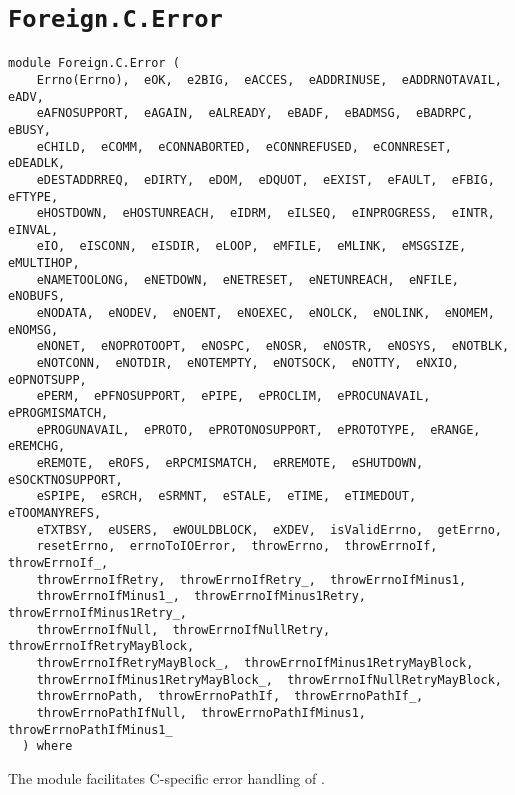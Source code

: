 \chapter{\texttt{Foreign.C.Error}}
\label{module:Foreign.C.Error}
\haddockbeginheader
{\haddockverb\begin{verbatim}
module Foreign.C.Error (
    Errno(Errno),  eOK,  e2BIG,  eACCES,  eADDRINUSE,  eADDRNOTAVAIL,  eADV, 
    eAFNOSUPPORT,  eAGAIN,  eALREADY,  eBADF,  eBADMSG,  eBADRPC,  eBUSY, 
    eCHILD,  eCOMM,  eCONNABORTED,  eCONNREFUSED,  eCONNRESET,  eDEADLK, 
    eDESTADDRREQ,  eDIRTY,  eDOM,  eDQUOT,  eEXIST,  eFAULT,  eFBIG,  eFTYPE, 
    eHOSTDOWN,  eHOSTUNREACH,  eIDRM,  eILSEQ,  eINPROGRESS,  eINTR,  eINVAL, 
    eIO,  eISCONN,  eISDIR,  eLOOP,  eMFILE,  eMLINK,  eMSGSIZE,  eMULTIHOP, 
    eNAMETOOLONG,  eNETDOWN,  eNETRESET,  eNETUNREACH,  eNFILE,  eNOBUFS, 
    eNODATA,  eNODEV,  eNOENT,  eNOEXEC,  eNOLCK,  eNOLINK,  eNOMEM,  eNOMSG, 
    eNONET,  eNOPROTOOPT,  eNOSPC,  eNOSR,  eNOSTR,  eNOSYS,  eNOTBLK, 
    eNOTCONN,  eNOTDIR,  eNOTEMPTY,  eNOTSOCK,  eNOTTY,  eNXIO,  eOPNOTSUPP, 
    ePERM,  ePFNOSUPPORT,  ePIPE,  ePROCLIM,  ePROCUNAVAIL,  ePROGMISMATCH, 
    ePROGUNAVAIL,  ePROTO,  ePROTONOSUPPORT,  ePROTOTYPE,  eRANGE,  eREMCHG, 
    eREMOTE,  eROFS,  eRPCMISMATCH,  eRREMOTE,  eSHUTDOWN,  eSOCKTNOSUPPORT, 
    eSPIPE,  eSRCH,  eSRMNT,  eSTALE,  eTIME,  eTIMEDOUT,  eTOOMANYREFS, 
    eTXTBSY,  eUSERS,  eWOULDBLOCK,  eXDEV,  isValidErrno,  getErrno, 
    resetErrno,  errnoToIOError,  throwErrno,  throwErrnoIf,  throwErrnoIf_, 
    throwErrnoIfRetry,  throwErrnoIfRetry_,  throwErrnoIfMinus1, 
    throwErrnoIfMinus1_,  throwErrnoIfMinus1Retry,  throwErrnoIfMinus1Retry_, 
    throwErrnoIfNull,  throwErrnoIfNullRetry,  throwErrnoIfRetryMayBlock, 
    throwErrnoIfRetryMayBlock_,  throwErrnoIfMinus1RetryMayBlock, 
    throwErrnoIfMinus1RetryMayBlock_,  throwErrnoIfNullRetryMayBlock, 
    throwErrnoPath,  throwErrnoPathIf,  throwErrnoPathIf_, 
    throwErrnoPathIfNull,  throwErrnoPathIfMinus1,  throwErrnoPathIfMinus1_
  ) where\end{verbatim}}
\haddockendheader

The module  facilitates C-specific error
 handling of .
\par

